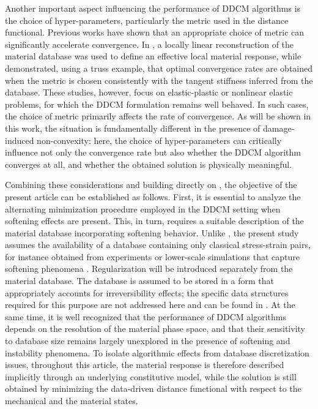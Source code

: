 \documentclass[10pt]{cas-sc}
\begin{document}
Another important aspect influencing the performance of DDCM algorithms is the choice of hyper-parameters, particularly the metric used in the distance functional. Previous works have shown that an appropriate choice of metric can significantly accelerate convergence. In \cite{Pham2023}, a locally linear reconstruction of the material database was used to define an effective local material response, while \cite{Nguyen2022} demonstrated, using a truss example, that optimal convergence rates are obtained when the metric is chosen consistently with the tangent stiffness inferred from the database. These studies, however, focus on elastic-plastic or nonlinear elastic problems, for which the DDCM formulation remains well behaved. In such cases, the choice of metric primarily affects the rate of convergence. As will be shown in this work, the situation is fundamentally different in the presence of damage-induced non-convexity: here, the choice of hyper-parameters can critically influence not only the convergence rate but also whether the DDCM algorithm converges at all, and whether the obtained solution is physically meaningful.

Combining these considerations and building directly on \cite{Kamasamudram2023}, the objective of the present article can be established as follows. First, it is essential to analyze the alternating minimization procedure employed in the DDCM setting when softening effects are present. This, in turn, requires a suitable description of the material database incorporating softening behavior. Unlike \cite{Ulloa2024}, the present study assumes the availability of a database containing only classical stress-strain pairs, for instance obtained from experiments or lower-scale simulations that capture softening phenomena \cite{nguyen2010existence,nguyen2012enhanced,Nguyen2019}. Regularization will be introduced separately from the material database. The database is assumed to be stored in a form that appropriately accounts for irreversibility effects; the specific data structures required for this purpose are not addressed here and can be found in \cite{Eggersmann2021a,Dandin2024}. At the same time, it is well recognized that the performance of DDCM algorithms depends on the resolution of the material phase space, and that their sensitivity to database size remains largely unexplored in the presence of softening and instability phenomena. To isolate algorithmic effects from database discretization issues, throughout this article, the material response is therefore described implicitly through an underlying constitutive model, while the solution is still obtained by minimizing the data-driven distance functional with respect to the mechanical and the material states.
\end{document}

